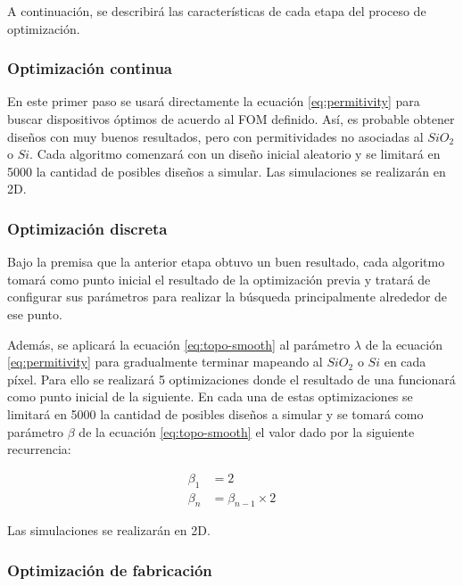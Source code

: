A continuación, se describirá las características de cada etapa del proceso de optimización.

\subsubsection{Optimización continua}

En este primer paso se usará directamente la ecuación \ref{eq:permitivity} para buscar dispositivos óptimos de acuerdo al FOM definido.
Así, es probable obtener diseños con muy buenos resultados, pero con permitividades no asociadas al $SiO_2$ o $Si$.
Cada algoritmo comenzará con un diseño inicial aleatorio y se limitará en 5000 la cantidad de posibles diseños a simular. 
Las simulaciones se realizarán en 2D.

\subsubsection{Optimización discreta}

Bajo la premisa que la anterior etapa obtuvo un buen resultado, cada algoritmo tomará como punto inicial el resultado de la optimización previa y tratará de configurar sus parámetros para realizar la búsqueda principalmente alrededor de ese punto.

Además, se aplicará la ecuación \ref{eq:topo-smooth} al parámetro $\lambda$ de la ecuación \ref{eq:permitivity} para gradualmente terminar mapeando al $SiO_2$ o $Si$ en cada píxel. 
Para ello se realizará 5 optimizaciones donde el resultado de una funcionará como punto inicial de la siguiente.
En cada una de estas optimizaciones se limitará en 5000 la cantidad de posibles diseños a simular y se tomará como parámetro $\beta$ de la ecuación \ref{eq:topo-smooth} el valor dado por la siguiente recurrencia:

\begin{equation}
  \begin{split}
    \beta_1 &= 2\\
    \beta_n &= \beta_{n-1} \times 2
  \end{split}
  \label{eq:beta-param}
\end{equation}

Las simulaciones se realizarán en 2D.

\subsubsection{Optimización de fabricación}

